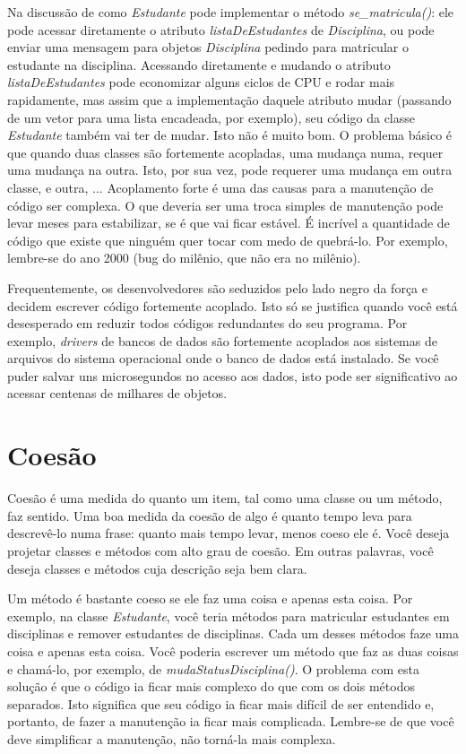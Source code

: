 \documentclass[
	article,			%
	12pt,				%
	openright,
	twoside,			%
	a4paper,			%
	english,			%
	french,
	brazil,				%
	sumario=tradicional
	]{abntex2}
\begin{document}
Na discussão de como \emph{Estudante} pode implementar o método \emph{se\_matricula()}: ele pode acessar diretamente o atributo \emph{listaDeEstudantes} de \emph{Disciplina}, ou pode enviar uma mensagem para objetos \emph{Disciplina} pedindo para matricular o estudante na disciplina. Acessando diretamente e mudando o atributo \emph{listaDeEstudantes} pode economizar alguns ciclos de CPU e rodar mais rapidamente, mas assim que a implementação daquele atributo mudar (passando de um vetor para uma lista encadeada, por exemplo), seu código da classe \emph{Estudante} também vai ter de mudar. Isto não é muito bom. O problema básico é que quando duas classes são fortemente acopladas, uma mudança numa, requer uma mudança na outra. Isto, por sua vez, pode requerer uma mudança em outra classe, e outra, ... Acoplamento forte é uma das causas para a manutenção de código ser complexa. O que deveria ser uma troca simples de manutenção pode levar meses para estabilizar, se é que vai ficar estável. É incrível a quantidade de código que existe que ninguém quer tocar com medo de quebrá-lo. Por exemplo, lembre-se do ano 2000 (bug do milênio, que não era no milênio).

Frequentemente, os desenvolvedores são seduzidos pelo lado negro da força e decidem escrever código fortemente acoplado. Isto só se justifica quando você está desesperado em reduzir todos códigos redundantes do seu programa. Por exemplo, \textit{drivers} de bancos de dados são fortemente acoplados aos sistemas de arquivos do sistema operacional onde o banco de dados está instalado. Se você puder salvar uns microsegundos no acesso aos dados, isto pode ser significativo ao acessar centenas de milhares de objetos.

\section{Coesão}

Coesão é uma medida do quanto um item, tal como uma classe ou um método, faz sentido. Uma boa medida da coesão de algo é quanto tempo leva para descrevê-lo numa frase: quanto mais tempo levar, menos coeso ele é. Você deseja projetar classes e métodos com alto grau de coesão. Em outras palavras, você deseja classes e métodos cuja descrição seja bem clara.

Um método é bastante coeso se ele faz uma coisa e apenas esta coisa. Por exemplo, na classe \emph{Estudante}, você teria métodos para matricular estudantes em disciplinas e remover estudantes de disciplinas. Cada um desses métodos faze uma coisa e apenas esta coisa. Você poderia escrever um método que faz as duas coisas e chamá-lo, por exemplo, de \emph{mudaStatusDisciplina()}. O problema com esta solução é que o código ia ficar mais complexo do que com os dois métodos separados. Isto significa que seu código ia ficar mais difícil de ser entendido e, portanto, de fazer a manutenção ia ficar mais complicada. Lembre-se de que você deve simplificar a manutenção, não torná-la mais complexa.
\end{document}
